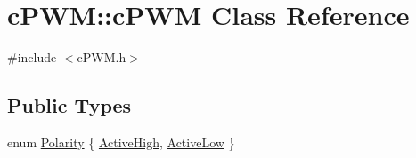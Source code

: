 \hypertarget{classc_p_w_m_1_1c_p_w_m}{\section{c\-P\-W\-M\-:\-:c\-P\-W\-M \-Class \-Reference}
\label{classc_p_w_m_1_1c_p_w_m}
}


{\ttfamily \#include $<$c\-P\-W\-M.\-h$>$}

\subsection*{\-Public \-Types}
\begin{DoxyCompactItemize}
\item 
enum \hyperlink{classc_p_w_m_1_1c_p_w_m_af190eac685b62a4a27e3b9b6fc3aba09}{\-Polarity} \{ \hyperlink{classc_p_w_m_1_1c_p_w_m_af190eac685b62a4a27e3b9b6fc3aba09a7e9862f0d7812ec1c9c89797aa8abf25}{\-Active\-High}, 
\hyperlink{classc_p_w_m_1_1c_p_w_m_af190eac685b62a4a27e3b9b6fc3aba09a94c88fb15c7102bd8e872e84170f69d6}{\-Active\-Low}
 \}
\end{DoxyCompactItemize}
